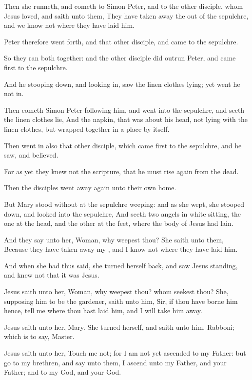 \verse Then she runneth, and cometh to Simon Peter, and to the other disciple, whom Jesus loved, and saith unto them, They have taken away the \LORD out of the sepulchre, and we know not where they have laid him.

\verse Peter therefore went forth, and that other disciple, and came to the sepulchre.

\verse So they ran both together: and the other disciple did outrun Peter, and came first to the sepulchre.

\verse And he stooping down, and looking in, saw the linen clothes lying; yet went he not in.

\verse Then cometh Simon Peter following him, and went into the sepulchre, and seeth the linen clothes lie, \verse And the napkin, that was about his head, not lying with the linen clothes, but wrapped together in a place by itself.

\verse Then went in also that other disciple, which came first to the sepulchre, and he saw, and believed.

\verse For as yet they knew not the scripture, that he must rise again from the dead.

\verse Then the disciples went away again unto their own home.

\verse But Mary stood without at the sepulchre weeping: and as she wept, she stooped down, and looked into the sepulchre, \verse And seeth two angels in white sitting, the one at the head, and the other at the feet, where the body of Jesus had lain.

\verse And they say unto her, Woman, why weepest thou? She saith unto them, Because they have taken away my \LORD, and I know not where they have laid him.

\verse And when she had thus said, she turned herself back, and saw Jesus standing, and knew not that it was Jesus.

\verse Jesus saith unto her, Woman, why weepest thou? whom seekest thou?  She, supposing him to be the gardener, saith unto him, Sir, if thou have borne him hence, tell me where thou hast laid him, and I will take him away.

\verse Jesus saith unto her, Mary. She turned herself, and saith unto him, Rabboni; which is to say, Master.

\verse Jesus saith unto her, Touch me not; for I am not yet ascended to my Father: but go to my brethren, and say unto them, I ascend unto my Father, and your Father; and to my God, and your God.


